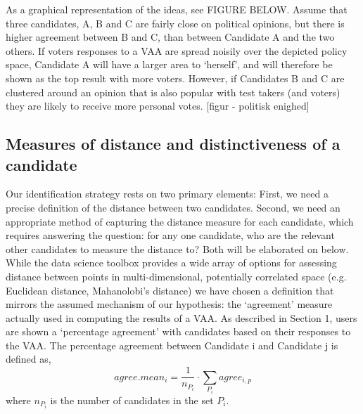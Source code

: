 As a graphical representation of the ideas, see FIGURE BELOW. Assume that three candidates, A, B and C are fairly close on political opinions, but there is higher agreement between B and C, than between Candidate A and the two others. If voters responses to a VAA are spread noisily over the depicted policy space, Candidate A will have a larger area to ‘herself’, and will therefore be shown as the top result with more voters. However, if Candidates B and C are clustered around an opinion that is also popular with test takers (and voters) they are likely to receive more personal votes.
[figur - politisk enighed]

\subsection{Measures of distance and distinctiveness of a candidate}
Our identification strategy rests on two primary elements: First, we need a precise definition of the distance between two candidates. Second, we need an appropriate method of capturing the distance measure for each candidate, which requires answering the question: for any one candidate, who are the relevant other candidates to measure the distance to? Both will be elaborated on below.
While the data science toolbox provides a wide array of options for assessing distance between points in multi-dimensional, potentially correlated space (e.g. Euclidean distance, Mahanolobi’s distance) we have chosen a definition that mirrors the assumed mechanism of our hypothesis: the ‘agreement’ measure actually used in computing the results of a VAA. As described in Section 1, users are shown a ‘percentage agreement’ with candidates based on their responses to the VAA. The percentage agreement between Candidate i and Candidate j is defined as,
\begin{equation}
agree.mean_{i}	=	\dfrac{1}{n_{P_{i}}}\cdot\sum_{P_{i}}agree_{i,p}
\end{equation}
where $n_{P_{i}}$ is the number of candidates in the set $P_i$.

